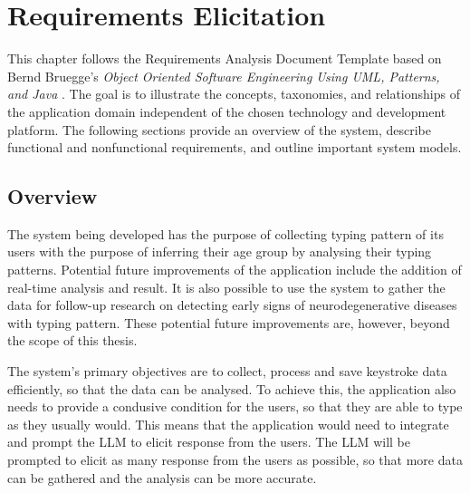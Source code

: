 \chapter{Requirements Elicitation}



This chapter follows the Requirements Analysis Document Template based on Bernd Bruegge's \textit{Object Oriented Software Engineering Using UML, Patterns, and Java} \cite{bruegge2004object}. 
The goal is to illustrate the concepts, taxonomies, and relationships of the application domain independent of the chosen technology and development platform. 
The following sections provide an overview of the system, describe functional and nonfunctional requirements, and outline important system models.

\section{Overview}


The system being developed has the purpose of collecting typing pattern of its users with the purpose of inferring their age group by analysing their typing patterns.
Potential future improvements of the application include the addition of real-time analysis and result.
It is also possible to use the system to gather the data for follow-up research on detecting early signs of neurodegenerative diseases with typing pattern.
These potential future improvements are, however, beyond the scope of this thesis.

The system's primary objectives are to collect, process and save keystroke data efficiently, so that the data can be analysed.
To achieve this, the application also needs to provide a condusive condition for the users, so that they are able to type as they usually would.
This means that the application would need to integrate and prompt the \ac{LLM} to elicit response from the users.
The \ac{LLM} will be prompted to elicit as many response from the users as possible, so that more data can be gathered and the analysis can be more accurate.


